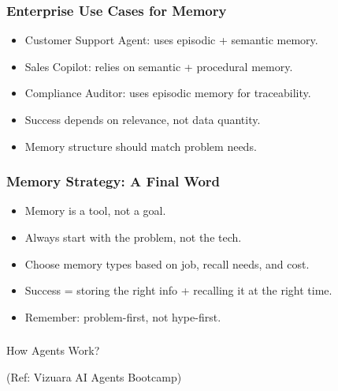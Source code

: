 \begin{frame}[fragile]\frametitle{Enterprise Use Cases for Memory}
\begin{itemize}
  \item Customer Support Agent: uses episodic + semantic memory.
  \item Sales Copilot: relies on semantic + procedural memory.
  \item Compliance Auditor: uses episodic memory for traceability.
  \item Success depends on relevance, not data quantity.
  \item Memory structure should match problem needs.
\end{itemize}
\end{frame}

\begin{frame}[fragile]\frametitle{Memory Strategy: A Final Word}
\begin{itemize}
  \item Memory is a tool, not a goal.
  \item Always start with the problem, not the tech.
  \item Choose memory types based on job, recall needs, and cost.
  \item Success = storing the right info + recalling it at the right time.
  \item Remember: problem-first, not hype-first.
\end{itemize}
\end{frame}

\begin{frame}[fragile]\frametitle{}
\begin{center}
{\Large How Agents Work?}

{\tiny (Ref: Vizuara AI Agents Bootcamp)}
\end{center}
\end{frame}

